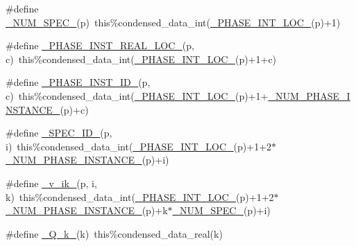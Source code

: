 \begin{DoxyCompactItemize}
\item 
\#define \mbox{\hyperlink{sub__model___u_n_i_f_a_c_8_f90_a6a6c2afb1b313ca5d982039833f5da8a}{\+\_\+\+N\+U\+M\+\_\+\+S\+P\+E\+C\+\_\+}}(p)~this\%condensed\+\_\+data\+\_\+int(\mbox{\hyperlink{sub__model___u_n_i_f_a_c_8_f90_a1d3113ce4335ed8f59d5278a96baf2db}{\+\_\+\+P\+H\+A\+S\+E\+\_\+\+I\+N\+T\+\_\+\+L\+O\+C\+\_\+}}(p)+1)
\item 
\#define \mbox{\hyperlink{sub__model___u_n_i_f_a_c_8_f90_ae36fd1141e660c79dd12eac64d119f66}{\+\_\+\+P\+H\+A\+S\+E\+\_\+\+I\+N\+S\+T\+\_\+\+R\+E\+A\+L\+\_\+\+L\+O\+C\+\_\+}}(p,  c)~this\%condensed\+\_\+data\+\_\+int(\mbox{\hyperlink{sub__model___u_n_i_f_a_c_8_f90_a1d3113ce4335ed8f59d5278a96baf2db}{\+\_\+\+P\+H\+A\+S\+E\+\_\+\+I\+N\+T\+\_\+\+L\+O\+C\+\_\+}}(p)+1+c)
\item 
\#define \mbox{\hyperlink{sub__model___u_n_i_f_a_c_8_f90_a639a43c584efe5284f81a20155a5475c}{\+\_\+\+P\+H\+A\+S\+E\+\_\+\+I\+N\+S\+T\+\_\+\+I\+D\+\_\+}}(p,  c)~this\%condensed\+\_\+data\+\_\+int(\mbox{\hyperlink{sub__model___u_n_i_f_a_c_8_f90_a1d3113ce4335ed8f59d5278a96baf2db}{\+\_\+\+P\+H\+A\+S\+E\+\_\+\+I\+N\+T\+\_\+\+L\+O\+C\+\_\+}}(p)+1+\mbox{\hyperlink{sub__model___u_n_i_f_a_c_8_f90_ad23acf7c0b198dc8792d7404114004ea}{\+\_\+\+N\+U\+M\+\_\+\+P\+H\+A\+S\+E\+\_\+\+I\+N\+S\+T\+A\+N\+C\+E\+\_\+}}(p)+c)
\item 
\#define \mbox{\hyperlink{sub__model___u_n_i_f_a_c_8_f90_aa61c08d2df81c9144bc7238e289c4183}{\+\_\+\+S\+P\+E\+C\+\_\+\+I\+D\+\_\+}}(p,  i)~this\%condensed\+\_\+data\+\_\+int(\mbox{\hyperlink{sub__model___u_n_i_f_a_c_8_f90_a1d3113ce4335ed8f59d5278a96baf2db}{\+\_\+\+P\+H\+A\+S\+E\+\_\+\+I\+N\+T\+\_\+\+L\+O\+C\+\_\+}}(p)+1+2$\ast$\mbox{\hyperlink{sub__model___u_n_i_f_a_c_8_f90_ad23acf7c0b198dc8792d7404114004ea}{\+\_\+\+N\+U\+M\+\_\+\+P\+H\+A\+S\+E\+\_\+\+I\+N\+S\+T\+A\+N\+C\+E\+\_\+}}(p)+i)
\item 
\#define \mbox{\hyperlink{sub__model___u_n_i_f_a_c_8_f90_a243d3b336ab8d54ce6fa47e406ab8b0b}{\+\_\+v\+\_\+ik\+\_\+}}(p,  i,  k)~this\%condensed\+\_\+data\+\_\+int(\mbox{\hyperlink{sub__model___u_n_i_f_a_c_8_f90_a1d3113ce4335ed8f59d5278a96baf2db}{\+\_\+\+P\+H\+A\+S\+E\+\_\+\+I\+N\+T\+\_\+\+L\+O\+C\+\_\+}}(p)+1+2$\ast$\mbox{\hyperlink{sub__model___u_n_i_f_a_c_8_f90_ad23acf7c0b198dc8792d7404114004ea}{\+\_\+\+N\+U\+M\+\_\+\+P\+H\+A\+S\+E\+\_\+\+I\+N\+S\+T\+A\+N\+C\+E\+\_\+}}(p)+k$\ast$\mbox{\hyperlink{sub__model___u_n_i_f_a_c_8_f90_a6a6c2afb1b313ca5d982039833f5da8a}{\+\_\+\+N\+U\+M\+\_\+\+S\+P\+E\+C\+\_\+}}(p)+i)
\item 
\#define \mbox{\hyperlink{sub__model___u_n_i_f_a_c_8_f90_a1b743cb32a79a4f088f810ff76220d66}{\+\_\+\+Q\+\_\+k\+\_\+}}(k)~this\%condensed\+\_\+data\+\_\+real(k)

\end{DoxyCompactItemize}
